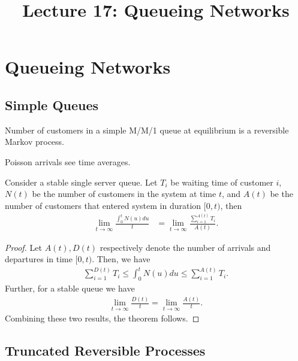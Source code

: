 \documentclass[a4paper,10pt,english]{article}
\title{Lecture 17: Queueing Networks}
\author{}
\begin{document}
\maketitle

\section{Queueing Networks}

\subsection{Simple Queues}
\begin{cor} Number of customers in a simple M/M/1 queue at equilibrium is a reversible Markov process.
\end{cor}

\begin{thm}[PASTA] Poisson arrivals see time averages.
\end{thm}
\begin{thm} Consider a stable single server queue. Let $T_i$ be waiting time of customer $i$, $N(t)$ be the number of customers in the system at time $t$, and $A(t)$ be the number of customers that entered system in duration $[0,t)$, then
\begin{align*}
\lim_{t \to \infty}\frac{\int_{0}^tN(u)du}{t} &= \lim_{t \to \infty} \frac{\sum_{i=1}^{A(t)}T_i}{A(t)}.
\end{align*} 
\end{thm}
\begin{proof}
Let $A(t), D(t)$ respectively denote the number of arrivals and departures in time $[0,t)$. Then, we have 
\begin{align*}
\sum_{i=1}^{D(t)}T_i \leq \int_{0}^tN(u)du \leq \sum_{i=1}^{A(t)}T_i.
\end{align*}
Further, for a stable queue we have
\begin{align*}
\lim_{t \to \infty}\frac{D(t)}{t} = \lim_{t \to \infty}\frac{A(t)}{t}.
\end{align*}
Combining these two results, the theorem follows.
\end{proof}

\subsection{Truncated Reversible Processes}
\end{document}
